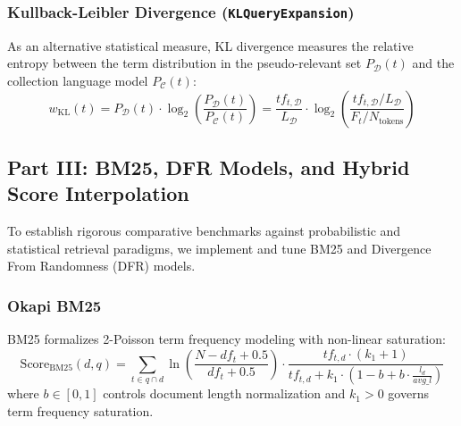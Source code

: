 \documentclass[10pt, a4paper]{article}
\begin{document}
\subsubsection{Kullback-Leibler Divergence (\texttt{KLQueryExpansion})}
As an alternative statistical measure, KL divergence measures the relative entropy between the term distribution in the pseudo-relevant set $P_{\mathcal{D}}(t)$ and the collection language model $P_{\mathcal{C}}(t)$:
\begin{equation}
w_{\text{KL}}(t) = P_{\mathcal{D}}(t) \cdot \log_2\left(\frac{P_{\mathcal{D}}(t)}{P_{\mathcal{C}}(t)}\right) = \frac{tf_{t, \mathcal{D}}}{L_{\mathcal{D}}} \cdot \log_2\left(\frac{tf_{t, \mathcal{D}} / L_{\mathcal{D}}}{F_t / N_{\text{tokens}}}\right)
\end{equation}

\subsection{Part III: BM25, DFR Models, and Hybrid Score Interpolation}
\label{sec:impl_part3}

To establish rigorous comparative benchmarks against probabilistic and statistical retrieval paradigms, we implement and tune BM25 and Divergence From Randomness (DFR) models.

\subsubsection{Okapi BM25}
BM25 formalizes 2-Poisson term frequency modeling with non-linear saturation:
\begin{equation}
\text{Score}_{\text{BM25}}(d, q) = \sum_{t \in q \cap d} \ln\left(\frac{N - df_t + 0.5}{df_t + 0.5}\right) \cdot \frac{tf_{t,d} \cdot (k_1 + 1)}{tf_{t,d} + k_1 \cdot \left(1 - b + b \cdot \frac{l_d}{avg\_l}\right)}
\label{eq:bm25}
\end{equation}
where $b \in [0, 1]$ controls document length normalization and $k_1 > 0$ governs term frequency saturation.
\end{document}
